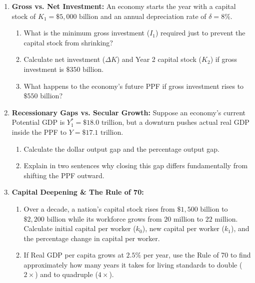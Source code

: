 \documentclass[11pt,letterpaper]{article}
\begin{document}
\begin{enumerate}
  \item \textbf{Gross vs. Net Investment:} An economy starts the year with a capital stock of $K_1 = \$5,000\text{ billion}$ and an annual depreciation rate of $\delta = 8\%$.
  \begin{enumerate}
    \item What is the minimum gross investment ($I_1$) required just to prevent the capital stock from shrinking?
    \item Calculate net investment ($\Delta K$) and Year 2 capital stock ($K_2$) if gross investment is $\$350\text{ billion}$.
    \item What happens to the economy's future PPF if gross investment rises to $\$550\text{ billion}$?
  \end{enumerate}
  \item \textbf{Recessionary Gaps vs. Secular Growth:} Suppose an economy's current Potential GDP is $Y^*_1 = \$18.0\text{ trillion}$, but a downturn pushes actual real GDP inside the PPF to $Y = \$17.1\text{ trillion}$.
  \begin{enumerate}
    \item Calculate the dollar output gap and the percentage output gap.
    \item Explain in two sentences why closing this gap differs fundamentally from shifting the PPF outward.
  \end{enumerate}
  \item \textbf{Capital Deepening \& The Rule of 70:}
  \begin{enumerate}
    \item Over a decade, a nation's capital stock rises from $\$1,500\text{ billion}$ to $\$2,200\text{ billion}$ while its workforce grows from $20\text{ million}$ to $22\text{ million}$. Calculate initial capital per worker ($k_0$), new capital per worker ($k_1$), and the percentage change in capital per worker.
    \item If Real GDP per capita grows at $2.5\%$ per year, use the Rule of 70 to find approximately how many years it takes for living standards to double ($2\times$) and to quadruple ($4\times$).
  \end{enumerate}
\end{enumerate}
\end{document}
